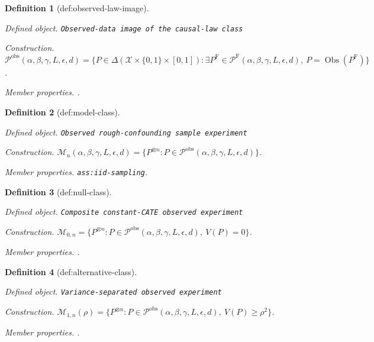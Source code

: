 \documentclass{article}
\newtheorem{definition}{Definition}
\begin{document}
\begin{definition}[def:observed-law-image]\label{def:observed-law-image}
\par\smallskip\noindent\emph{Defined object.} \texttt{Observed-\allowbreak{}data image of the causal-\allowbreak{}law class}
\par\smallskip\noindent\emph{Construction.} \(\mathcal P^{\mathrm{obs}}(\alpha,\beta,\gamma,L,\epsilon,d)=\{P\in\Delta(\mathcal X\times\{0,1\}\times[0,1]):\exists P^{\mathrm F}\in\mathcal P^{\mathrm F}(\alpha,\beta,\gamma,L,\epsilon,d),\ P=\operatorname{Obs}(P^{\mathrm F})\}\).
\par\smallskip\noindent\emph{Member properties.} .
\end{definition}

\begin{definition}[def:model-class]\label{def:model-class}
\par\smallskip\noindent\emph{Defined object.} \texttt{Observed rough-\allowbreak{}confounding sample experiment}
\par\smallskip\noindent\emph{Construction.} \(\mathcal M_n(\alpha,\beta,\gamma,L,\epsilon,d)=\{P^{\otimes n}:P\in\mathcal P^{\mathrm{obs}}(\alpha,\beta,\gamma,L,\epsilon,d)\}\).
\par\smallskip\noindent\emph{Member properties.} \texttt{ass:\allowbreak{}iid-\allowbreak{}sampling}.
\end{definition}

\begin{definition}[def:null-class]\label{def:null-class}
\par\smallskip\noindent\emph{Defined object.} \texttt{Composite constant-\allowbreak{}CATE observed experiment}
\par\smallskip\noindent\emph{Construction.} \(\mathcal M_{0,n}=\{P^{\otimes n}:P\in\mathcal P^{\mathrm{obs}}(\alpha,\beta,\gamma,L,\epsilon,d),\ V(P)=0\}\).
\par\smallskip\noindent\emph{Member properties.} .
\end{definition}

\begin{definition}[def:alternative-class]\label{def:alternative-class}
\par\smallskip\noindent\emph{Defined object.} \texttt{Variance-\allowbreak{}separated observed experiment}
\par\smallskip\noindent\emph{Construction.} \(\mathcal M_{1,n}(\rho)=\{P^{\otimes n}:P\in\mathcal P^{\mathrm{obs}}(\alpha,\beta,\gamma,L,\epsilon,d),\ V(P)\ge\rho^2\}\).
\par\smallskip\noindent\emph{Member properties.} .
\end{definition}
\end{document}
